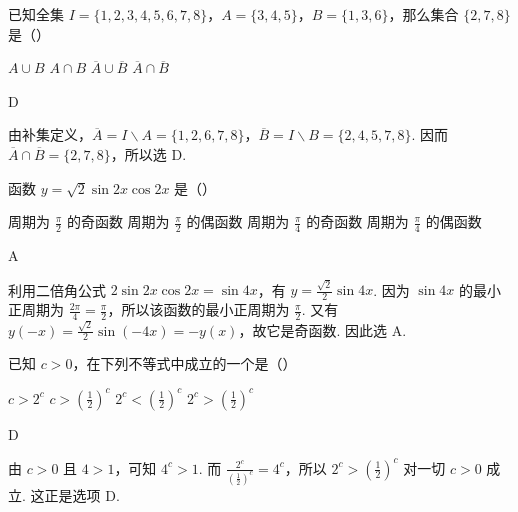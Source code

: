 \documentclass[UTF8,a4paper,oneside,11pt]{ctexbook}
\begin{document}
\begin{problem}
已知全集 \(I=\{1,2,3,4,5,6,7,8\}\)，\(A=\{3,4,5\}\)，\(B=\{1,3,6\}\)，那么集合 \(\{2,7,8\}\) 是（\quad）

\choices
    {\(A\cup B\)}
    {\(A\cap B\)}
    {\(\overline{A}\cup\overline{B}\)}
    {\(\overline{A}\cap\overline{B}\)}
\end{problem}

\begin{answer}
D
\end{answer}

\begin{solution}
由补集定义，\(\overline{A}=I\mathbin{\backslash}A=\{1,2,6,7,8\}\)，\(\overline{B}=I\mathbin{\backslash}B=\{2,4,5,7,8\}\). 因而 \(\overline{A}\cap\overline{B}=\{2,7,8\}\)，所以选 D.
\end{solution}

\begin{problem}
函数 \(y=\sqrt{2}\sin 2x\cos 2x\) 是（\quad）

\choices
    {周期为 \(\frac{\pi}{2}\) 的奇函数}
    {周期为 \(\frac{\pi}{2}\) 的偶函数}
    {周期为 \(\frac{\pi}{4}\) 的奇函数}
    {周期为 \(\frac{\pi}{4}\) 的偶函数}
\end{problem}

\begin{answer}
A
\end{answer}

\begin{solution}
利用二倍角公式 \(2\sin 2x\cos 2x=\sin 4x\)，有 \(y=\frac{\sqrt{2}}{2}\sin 4x\). 因为 \(\sin 4x\) 的最小正周期为 \(\frac{2\pi}{4}=\frac{\pi}{2}\)，所以该函数的最小正周期为 \(\frac{\pi}{2}\). 又有 \(y(-x)=\frac{\sqrt{2}}{2}\sin(-4x)=-y(x)\)，故它是奇函数. 因此选 A.
\end{solution}

\begin{problem}
已知 \(c>0\)，在下列不等式中成立的一个是（\quad）

\choices
    {\(c>2^c\)}
    {\(c>\left(\frac{1}{2}\right)^c\)}
    {\(2^c<\left(\frac{1}{2}\right)^c\)}
    {\(2^c>\left(\frac{1}{2}\right)^c\)}
\end{problem}

\begin{answer}
D
\end{answer}

\begin{solution}
由 \(c>0\) 且 \(4>1\)，可知 \(4^c>1\). 而 \(\displaystyle\frac{2^c}{\left(\frac{1}{2}\right)^c}=4^c\)，所以 \(2^c>\left(\frac{1}{2}\right)^c\) 对一切 \(c>0\) 成立. 这正是选项 D.
\end{solution}
\end{document}
